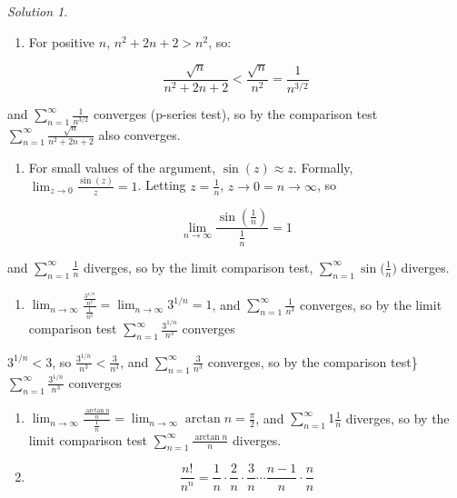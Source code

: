 \documentclass[
]{book}
\providecommand{\tightlist}{%
  \setlength{\itemsep}{0pt}\setlength{\parskip}{0pt}}
\theoremstyle{definition}
\theoremstyle{definition}
\theoremstyle{definition}
\theoremstyle{definition}
\theoremstyle{remark}
\newtheorem*{solution}{Solution}
\begin{document}
\begin{solution}

\begin{enumerate}
\def\labelenumi{\arabic{enumi}.}
\tightlist
\item
  For positive \(n\), \(n^2 + 2n + 2 > n^2\), so:
\end{enumerate}

\[ 
    \frac{\sqrt{n}}{n^2 + 2n + 2} < \frac{\sqrt{n}}{n^2} = \frac{1}{n^{3/2}}
\]

and \(\displaystyle \sum_{n=1}^{\infty} \frac{1}{n^{3/2}}\) converges (p-series test), so by the comparison test \(\displaystyle \sum_{n=1}^{\infty} \frac{\sqrt{n}}{n^2+2n+2}\) also converges.

\begin{enumerate}
\def\labelenumi{\arabic{enumi}.}
\setcounter{enumi}{1}
\tightlist
\item
  For small values of the argument, \(\sin(z) \approx z\). Formally, \(\displaystyle \lim_{z \to 0} \frac{\sin(z)}{z} = 1\). Letting \(z = \frac{1}{n}\), \(z \to 0 = n \to \infty\), so
\end{enumerate}

\[
    \lim_{n \to \infty} \frac{\sin\left(\frac{1}{n}\right)}{ \frac{1}{n}} = 1
\]

and \(\displaystyle \sum_{n=1}^{\infty} \frac{1}{n}\) diverges, so by the limit comparison test, \(\displaystyle \sum_{n=1}^{\infty} \sin \bigg(\frac{1}{n} \bigg)\) diverges.

\begin{enumerate}
\def\labelenumi{\arabic{enumi}.}
\setcounter{enumi}{2}
\tightlist
\item
  \(\displaystyle \lim_{n \to \infty} \frac{ \frac{3^{1/n}}{n^3}}{\frac{1}{n^3}} = \lim_{n \to \infty} 3^{1/n} = 1\), and \(\displaystyle \sum_{n=1}^{\infty} \frac{1}{n^3}\) converges, so by the limit comparison test \(\displaystyle \sum_{n=1}^{\infty} \frac{3^{1/n}}{n^3}\) converges
\end{enumerate}

\(3^{1/n} < 3\), so \(\displaystyle \frac{3^{1/n}}{n^3} < \frac{3}{n^3}\), and \(\displaystyle \sum_{n=1}^{\infty} \frac{3}{n^3}\) converges, so by the comparison test\} \(\displaystyle \sum_{n=1}^{\infty} \frac{3^{1/n}}{n^3}\) converges

\begin{enumerate}
\def\labelenumi{\arabic{enumi}.}
\setcounter{enumi}{3}
\item
  \(\displaystyle \lim_{n \to \infty} \frac{ \frac{\arctan n}{n}}{\frac{1}{n}} = \lim_{n \to \infty} \arctan{n} = \frac{\pi}{2}\), and \(\displaystyle \sum_{n=1}^{\infty}{1} \frac{1}{n}\) diverges, so by the limit comparison test \(\displaystyle \sum_{n=1}^{\infty} \frac{\arctan n}{n}\) diverges.
\item
  \[ 
   \frac{n!}{n^n} = \frac{1}{n} \cdot \frac{2}{n}  \cdot \frac{3}{n} \cdots \frac{n-1}{n} \cdot \frac{n}{n}
  \]
\end{enumerate}


\end{solution}
\end{document}

